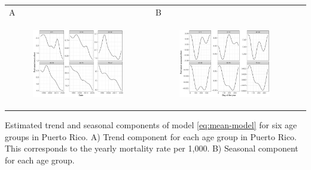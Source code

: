 \documentclass[11pt]{article}
\begin{document}
\begin{suppfigure}[ht]
	\begin{tabular}{lll}
	A&B\\
	\begin{subfigure}[t]{0.49\linewidth}
		\centering
		\includegraphics[width=1\linewidth]{figs/supp-figure-1a.pdf} 
	\end{subfigure}&
	\begin{subfigure}[t]{0.49\linewidth}
		\centering
		\includegraphics[width=1\linewidth]{figs/supp-figure-1b.pdf}
	\end{subfigure}&\\
    \end{tabular}
    \caption{Estimated trend and seasonal components of model \ref{eq:mean-model} for six age groups in Puerto Rico. A) Trend component for each age group in Puerto Rico. This corresponds to the yearly mortality rate per 1,000. B) Seasonal component for each age group.}
    \label{supp-fig:model-components}
\end{suppfigure}
\end{document}
